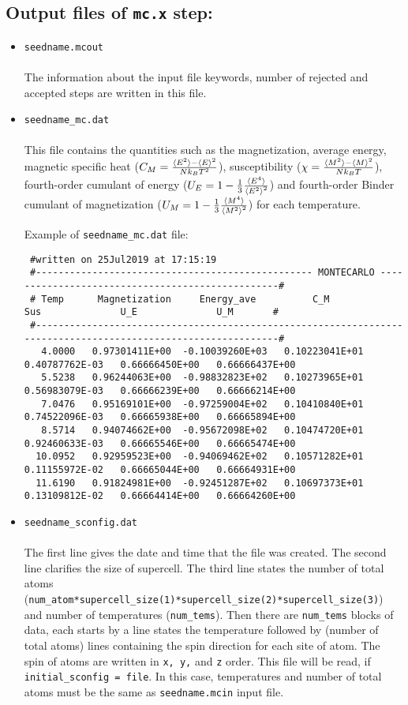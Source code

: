 \documentclass[10pt]{report}
\begin{document}
\subsection{Output files of {\tt mc.x} step:}
\begin{itemize}
\item {\tt seedname.mcout}\\\\
The information about the input file keywords, number of  
rejected and accepted steps are written in this file.
\item {\tt seedname\_mc.dat}\\\\
This file contains the quantities such as the magnetization, average energy,
 magnetic specific heat ($C_M=\frac{\braket{E^2}-\braket{E}^2}{Nk_BT^2}$),
 susceptibility ($\chi=\frac{\braket{M^2}-\braket{M}^2}{Nk_BT}$), 
fourth-order cumulant of energy ($U_E=1-\frac{1}{3}\frac{\braket{E^4}}{\braket{E^2}^2}$) 
and fourth-order Binder cumulant of magnetization ($U_M=1-\frac{1}{3}\frac{\braket{M^4}}{\braket{M^2}^2}$) for each temperature.

Example of {\tt seedname\_mc.dat} file:
{\scriptsize    
\begin{verbatim}
 #written on 25Jul2019 at 17:15:19 
 #------------------------------------------------- MONTECARLO -------------------------------------------------#
 # Temp      Magnetization     Energy_ave          C_M              Sus              U_E              U_M       #
 #--------------------------------------------------------------------------------------------------------------#
   4.0000   0.97301411E+00  -0.10039260E+03   0.10223041E+01   0.40787762E-03   0.66666450E+00   0.66666437E+00
   5.5238   0.96244063E+00  -0.98832823E+02   0.10273965E+01   0.56983079E-03   0.66666239E+00   0.66666214E+00
   7.0476   0.95169101E+00  -0.97259004E+02   0.10410840E+01   0.74522096E-03   0.66665938E+00   0.66665894E+00
   8.5714   0.94074662E+00  -0.95672098E+02   0.10474720E+01   0.92460633E-03   0.66665546E+00   0.66665474E+00
  10.0952   0.92959523E+00  -0.94069462E+02   0.10571282E+01   0.11155972E-02   0.66665044E+00   0.66664931E+00
  11.6190   0.91824981E+00  -0.92451287E+02   0.10697373E+01   0.13109812E-02   0.66664414E+00   0.66664260E+00
\end{verbatim}
}
\item {\tt seedname\_sconfig.dat}\\\\
The first line gives the date and time  that the file was created.
The second line clarifies the size of supercell.
The third line states the number of total atoms ({\tt num\_atom*supercell\_size(1)*supercell\_size(2)*supercell\_size(3)}) 
and number of temperatures ({\tt num\_tems}). Then there are {\tt num\_tems} blocks of data, each starts
by a line states the temperature followed by (number of total atoms) lines containing the spin direction for each site of atom.
The spin of atoms are written in {\tt x, y,} and {\tt z} order.
This file will be read, if {\tt initial\_sconfig = file}. In this case, temperatures and number of total atoms 
must be the same as {\tt seedname.mcin} input file.\\


\end{itemize}
\end{document}

